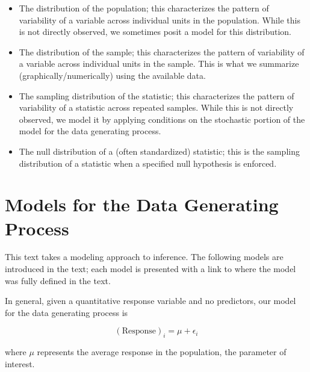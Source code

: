 \documentclass[
  letterpaper,
  DIV=11,
  numbers=noendperiod]{scrreprt}
\providecommand{\tightlist}{%
  \setlength{\itemsep}{0pt}\setlength{\parskip}{0pt}}\usepackage{longtable,booktabs,array}
\theoremstyle{plain}
\theoremstyle{definition}
\theoremstyle{definition}
\theoremstyle{remark}
\begin{document}
\begin{itemize}
\tightlist
\item
  The distribution of the population; this characterizes the pattern of
  variability of a variable across individual units in the population.
  While this is not directly observed, we sometimes posit a model for
  this distribution.
\item
  The distribution of the sample; this characterizes the pattern of
  variability of a variable across individual units in the sample. This
  is what we summarize (graphically/numerically) using the available
  data.
\item
  The sampling distribution of the statistic; this characterizes the
  pattern of variability of a statistic across repeated samples. While
  this is not directly observed, we model it by applying conditions on
  the stochastic portion of the model for the data generating process.
\item
  The null distribution of a (often standardized) statistic; this is the
  sampling distribution of a statistic when a specified null hypothesis
  is enforced.
\end{itemize}

\section{Models for the Data Generating
Process}\label{models-for-the-data-generating-process}

This text takes a modeling approach to inference. The following models
are introduced in the text; each model is presented with a link to where
the model was fully defined in the text.

\begin{tcolorbox}[enhanced jigsaw, breakable, titlerule=0mm, colframe=quarto-callout-important-color-frame, bottomtitle=1mm, opacityback=0, rightrule=.15mm, toptitle=1mm, arc=.35mm, bottomrule=.15mm, left=2mm, title=\textcolor{quarto-callout-important-color}{\faExclamation}\hspace{0.5em}{Data Generating Process for Single Mean Response
(Equation~\ref{eq-single-mean})}, leftrule=.75mm, coltitle=black, toprule=.15mm, colbacktitle=quarto-callout-important-color!10!white, colback=white, opacitybacktitle=0.6]

In general, given a quantitative response variable and no predictors,
our model for the data generating process is

\[(\text{Response})_i = \mu + \epsilon_i\]

where \(\mu\) represents the average response in the population, the
parameter of interest.

\end{tcolorbox}
\end{document}
